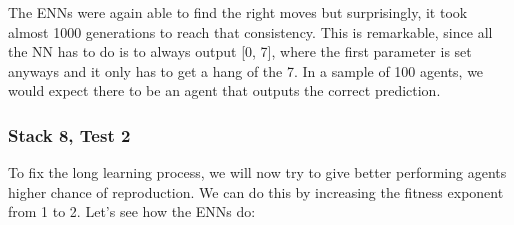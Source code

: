 \documentclass[11pt]{report}
\begin{document}
\begin{enumerate}
\begin{center}
    \end{center}
    The ENNs were again able to find the right moves but surprisingly, it took almost 1000 generations to reach that consistency.
    This is remarkable, since all the NN has to do is to always output [0, 7], where the first parameter is set anyways and it only has to get a hang of the 7.
    In a sample of 100 agents, we would expect there to be an agent that outputs the correct prediction.
                \subsubsection{Stack 8, Test 2}
    To fix the long learning process, we will now try to give better performing agents higher chance of reproduction.
    We can do this by increasing the fitness exponent from 1 to 2.
    Let's see how the ENNs do:
    \\
    \renewcommand{\csvpath}{../data/simple_nim/stack_8/t_2/stats.csv} %
    \begin{center}
\end{center}
\end{enumerate}
\end{document}

